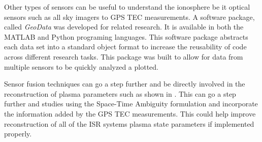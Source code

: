 Other types of sensors can be useful to understand the ionosphere be it optical sensors such as all sky imagers to GPS TEC measurements. A software package, called \textit{GeoData} was developed for related research. It is available in both the MATLAB \cite{john_swoboda_2016_154536} 
and Python \cite{john_swoboda_2016_154533} programing languages. This software package abstracts each data set into a standard object format to increase the reusability of code across different research tasks. This package was built to allow for data from multiple sensors to be quickly analyzed a plotted. 

Sensor fusion techniques can go a step further and be directly involved in the reconstruction of plasma parameters such as shown in \cite{Semeter:2016gm}. This can go a step further and studies using the Space-Time Ambiguity formulation and incorporate the information added by the GPS TEC measurements. This could help improve reconstruction of all of the ISR systems plasma state parameters if implemented properly.
